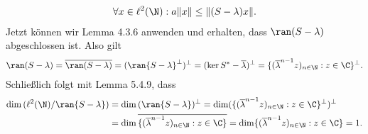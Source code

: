 \begin{solution}
\begin{enumerate}[label = (\alph*)]
\begin{align*}
    \forall x \in \ell^2(\N): a\|x\| \leq \|(S - \lambda)x\|.
  \end{align*}
  Jetzt können wir Lemma 4.3.6 anwenden und erhalten, dass $\ran(S - \lambda)$ abgeschlossen ist. Also gilt
  \begin{align*}
    \ran(S - \lambda) = \overline{\ran(S - \lambda)} = (\ran{S - \lambda}^{\bot})^{\bot}
    = (\ker{S^* - \overline{\lambda}})^{\bot} = \{(\overline{\lambda}^{n-1} z)_{n \in \N}: z \in \C\}^{\bot}.
  \end{align*}
  Schließlich folgt mit Lemma 5.4.9, dass
  \begin{align*}
    \dim{(\ell^2(\N) / \ran{S - \lambda})} &= \dim{(\ran{S - \lambda})^{\bot}}
    = \dim(\{(\overline{\lambda}^{n-1} z)_{n \in \N}: z \in \C\}^{\bot})^{\bot} \\
    &= \dim\overline{\{(\overline{\lambda}^{n-1} z)_{n \in \N}: z \in \C\}}
    = \dim\{(\overline{\lambda}^{n-1} z)_{n \in \N}: z \in \C\} = 1.
  \end{align*}
\end{enumerate}
\end{solution}
